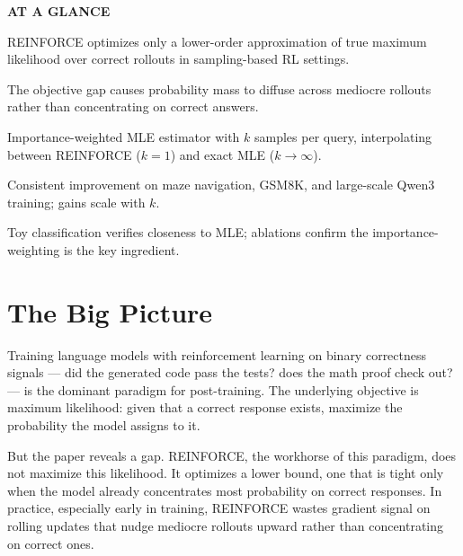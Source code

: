 \documentclass[10pt,twocolumn]{article}
\begin{document}
\begin{mdframed}[backgroundcolor=boxgray,linecolor=rulered,linewidth=1pt,
    innerleftmargin=6pt,innerrightmargin=6pt,
    innertopmargin=6pt,innerbottommargin=6pt]
\textbf{\small AT A GLANCE}\par\vspace{4pt}
\begin{description}[leftmargin=0pt,labelsep=4pt,itemsep=2pt,parsep=0pt,
    font=\small\bfseries]
  \item[Problem:] REINFORCE optimizes only a lower-order approximation of
    true maximum likelihood over correct rollouts in sampling-based RL settings.
  \item[Why it matters:] The objective gap causes probability mass to diffuse
    across mediocre rollouts rather than concentrating on correct answers.
  \item[Method:] Importance-weighted MLE estimator with $k$ samples per query,
    interpolating between REINFORCE ($k=1$) and exact MLE ($k\to\infty$).
  \item[Result:] Consistent improvement on maze navigation, GSM8K, and
    large-scale Qwen3 training; gains scale with $k$.
  \item[Evidence:] Toy classification verifies closeness to MLE; ablations
    confirm the importance-weighting is the key ingredient.
\end{description}
\end{mdframed}

\section{The Big Picture}

Training language models with reinforcement learning on binary correctness
signals --- did the generated code pass the tests? does the math proof check
out? --- is the dominant paradigm for post-training. The underlying objective
is maximum likelihood: given that a correct response exists, maximize the
probability the model assigns to it.

But the paper reveals a gap. REINFORCE, the workhorse of this paradigm,
does not maximize this likelihood. It optimizes a lower bound, one that is
tight only when the model already concentrates most probability on correct
responses. In practice, especially early in training, REINFORCE wastes gradient
signal on rolling updates that nudge mediocre rollouts upward rather than
concentrating on correct ones.
\end{document}
